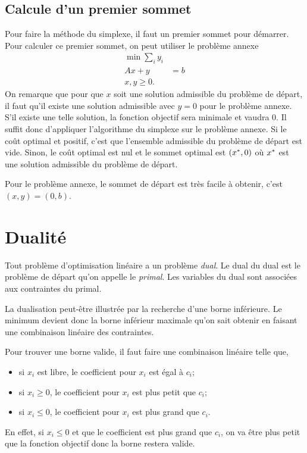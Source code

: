 \subsection{Calcule d'un premier sommet}
Pour faire la méthode du simplexe,
il faut un premier sommet pour démarrer.
Pour calculer ce premier sommet,
on peut utiliser le problème annexe
\begin{align*}
  \min \sum_i y_i\\
  Ax + y & = b\\
  x,y \geq 0.
\end{align*}
On remarque que
pour que $x$ soit une solution admissible du problème de départ,
il faut qu'il existe une solution admissible avec $y=0$ pour le problème
annexe.
S'il existe une telle solution, la fonction objectif sera minimale et
vaudra 0.
Il suffit donc d'appliquer l'algorithme du simplexe sur le problème annexe.
Si le coût optimal et positif, c'est que l'ensemble admissible du
problème de départ est vide.
Sinon, le coût optimal est nul et le sommet optimal est $(x^*,0)$
où $x^*$ est une solution admissible du problème de départ.

Pour le problème annexe, le sommet de départ est très facile à obtenir,
c'est $(x,y) = (0,b)$.

\section{Dualité}
Tout problème d'optimisation linéaire a un problème \emph{dual}.
Le dual du dual est le problème de départ qu'on appelle le \emph{primal}.
Les variables du dual sont associées aux contraintes du primal.

La dualisation peut-être illustrée par la recherche d'une borne inférieure.
Le minimum devient donc la borne inférieur maximale qu'on sait
obtenir en faisant une combinaison linéaire des contraintes.

Pour trouver une borne valide, il faut faire une combinaison linéaire
telle que,
\begin{itemize}
  \item si $x_i$ est libre, le coefficient pour $x_i$ est égal à $c_i$;
  \item si $x_i \geq 0$, le coefficient pour $x_i$ est plus petit que $c_i$;
  \item si $x_i \leq 0$, le coefficient pour $x_i$ est plus grand que $c_i$.
\end{itemize}
En effet, si $x_i \leq 0$ et que le coefficient est plus grand que $c_i$,
on va être plus petit que la fonction objectif donc la borne restera valide.

